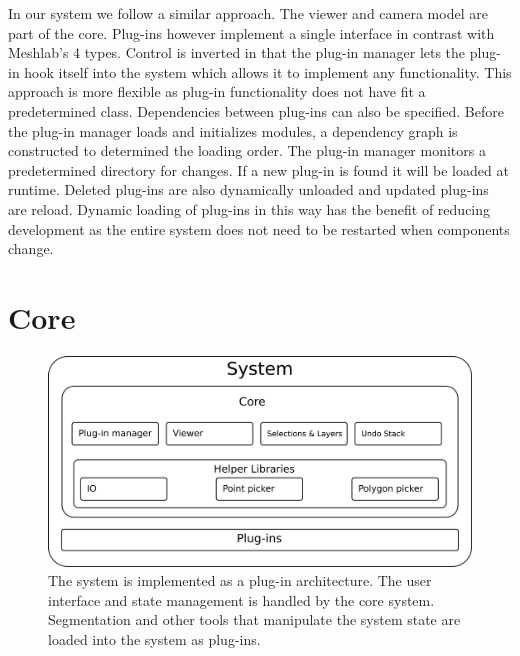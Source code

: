In our system we follow a similar approach. The viewer and camera model are part of the core. Plug-ins however implement a single interface in contrast with Meshlab's 4 types. Control is inverted in that the plug-in manager lets the plug-in hook itself into the system which allows it to implement any functionality. This approach is more flexible as plug-in functionality does not have fit a predetermined class. Dependencies between plug-ins can also be specified. Before the plug-in manager loads and initializes modules, a dependency graph is constructed to determined the loading order. The plug-in manager monitors a predetermined directory for changes. If a new plug-in is found it will be loaded at runtime. Deleted plug-ins are also dynamically unloaded and updated plug-ins are reload. Dynamic loading of plug-ins in this way has the benefit of reducing development as the entire system does not need to be restarted when components change.

\section{Core}

\begin{figure}[ht]
  \centering
  \includegraphics[width=.75\linewidth]{images/system}
  \caption[System architecture]{The system is implemented as a plug-in architecture. The user interface and state management is handled by the core system. Segmentation and other tools that manipulate the system state are loaded into the system as plug-ins.}
  \label{fig:system}
\end{figure}



